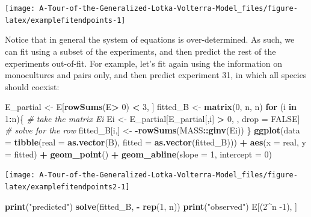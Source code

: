 \documentclass[
]{book}
\newenvironment{Shaded}{\begin{snugshade}}{\end{snugshade}}
\newcommand{\CommentTok}[1]{\textcolor[rgb]{0.56,0.35,0.01}{\textit{#1}}}
\newcommand{\ControlFlowTok}[1]{\textcolor[rgb]{0.13,0.29,0.53}{\textbf{#1}}}
\newcommand{\DataTypeTok}[1]{\textcolor[rgb]{0.13,0.29,0.53}{#1}}
\newcommand{\DecValTok}[1]{\textcolor[rgb]{0.00,0.00,0.81}{#1}}
\newcommand{\KeywordTok}[1]{\textcolor[rgb]{0.13,0.29,0.53}{\textbf{#1}}}
\newcommand{\NormalTok}[1]{#1}
\newcommand{\OperatorTok}[1]{\textcolor[rgb]{0.81,0.36,0.00}{\textbf{#1}}}
\newcommand{\OtherTok}[1]{\textcolor[rgb]{0.56,0.35,0.01}{#1}}
\newcommand{\StringTok}[1]{\textcolor[rgb]{0.31,0.60,0.02}{#1}}
\begin{document}
\begin{center}\texttt{[image: A-Tour-of-the-Generalized-Lotka-Volterra-Model\_files/figure-latex/examplefitendpoints-1]} \end{center}

Notice that in general the system of equations is over-determined. As such, we can fit using a subset of the experiments, and then predict the rest of the experiments out-of-fit. For example, let's fit again using the information on monocultures and pairs only, and then predict experiment 31, in which all species should coexist:

\begin{Shaded}
\begin{Highlighting}[]
\NormalTok{E_partial <-}\StringTok{ }\NormalTok{E[}\KeywordTok{rowSums}\NormalTok{(E}\OperatorTok{>}\StringTok{ }\DecValTok{0}\NormalTok{) }\OperatorTok{<}\StringTok{ }\DecValTok{3}\NormalTok{, ]}
\NormalTok{fitted_B <-}\StringTok{ }\KeywordTok{matrix}\NormalTok{(}\DecValTok{0}\NormalTok{, n, n)}
\ControlFlowTok{for}\NormalTok{ (i }\ControlFlowTok{in} \DecValTok{1}\OperatorTok{:}\NormalTok{n)\{}
  \CommentTok{# take the matrix Ei}
\NormalTok{  Ei <-}\StringTok{ }\NormalTok{E_partial[E_partial[,i] }\OperatorTok{>}\StringTok{ }\DecValTok{0}\NormalTok{, , drop =}\StringTok{ }\OtherTok{FALSE}\NormalTok{]}
  \CommentTok{# solve for the row}
\NormalTok{  fitted_B[i,] <-}\StringTok{ }\OperatorTok{-}\KeywordTok{rowSums}\NormalTok{(MASS}\OperatorTok{::}\KeywordTok{ginv}\NormalTok{(Ei))}
\NormalTok{\}}
\KeywordTok{ggplot}\NormalTok{(}\DataTypeTok{data =} \KeywordTok{tibble}\NormalTok{(}\DataTypeTok{real =} \KeywordTok{as.vector}\NormalTok{(B),}
                     \DataTypeTok{fitted =} \KeywordTok{as.vector}\NormalTok{(fitted_B))) }\OperatorTok{+}\StringTok{ }
\StringTok{  }\KeywordTok{aes}\NormalTok{(}\DataTypeTok{x =}\NormalTok{ real, }\DataTypeTok{y =}\NormalTok{ fitted) }\OperatorTok{+}\StringTok{ }\KeywordTok{geom_point}\NormalTok{() }\OperatorTok{+}\StringTok{ }
\StringTok{  }\KeywordTok{geom_abline}\NormalTok{(}\DataTypeTok{slope =} \DecValTok{1}\NormalTok{, }\DataTypeTok{intercept =} \DecValTok{0}\NormalTok{)}
\end{Highlighting}
\end{Shaded}

\begin{center}\texttt{[image: A-Tour-of-the-Generalized-Lotka-Volterra-Model\_files/figure-latex/examplefitendpoints2-1]} \end{center}

\begin{Shaded}
\begin{Highlighting}[]
\KeywordTok{print}\NormalTok{(}\StringTok{"predicted"}\NormalTok{)}
\KeywordTok{solve}\NormalTok{(fitted_B, }\OperatorTok{-}\StringTok{ }\KeywordTok{rep}\NormalTok{(}\DecValTok{1}\NormalTok{, n))}
\KeywordTok{print}\NormalTok{(}\StringTok{"observed"}\NormalTok{)}
\NormalTok{E[(}\DecValTok{2}\OperatorTok{^}\NormalTok{n }\DecValTok{-1}\NormalTok{), ]}
\end{Highlighting}
\end{Shaded}
\end{document}
